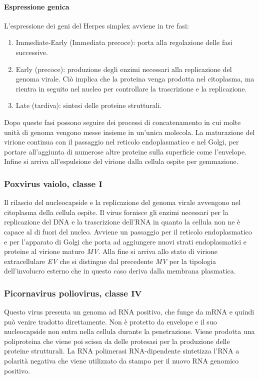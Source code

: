 			\paragraph{Espressione genica}
			L'espressione dei geni del Herpes simplex avviene in tre fasi:
			\begin{multicols}{2}
				\begin{enumerate}
    					\item Immediate-Early (Immediata precoce): porta alla regolazione delle fasi successive. 
    					\item Early (precoce): produzione degli enzimi necessari alla replicazione del genoma virale. 
						Ci\`o implica che la proteina venga prodotta nel citoplasma, ma rientra in seguito nel nucleo per controllare la trascrizione e la replicazione.
    					\item Late (tardiva): sintesi delle proteine strutturali.
				\end{enumerate}
			\end{multicols}
			Dopo queste fasi possono seguire dei processi di concatenamento in cui molte unit\`a di genoma vengono messe insieme in un'unica molecola. 
			La maturazione del virione continua con il passaggio nel reticolo endoplasmatico e nel Golgi, per portare all'aggiunta di numerose altre proteine sulla superficie come l'envelope. 
			Infine si arriva all'espulsione del virione dalla cellula ospite per gemmazione.

		\subsubsection{Poxvirus vaiolo, classe $\mathbf{I}$}
		Il rilascio del nucleocapside e la replicazione del genoma virale avvengono nel citoplasma della cellula ospite.
		Il virus fornisce gli enzimi necessari per la replicazione del DNA e la trascrizione dell'RNA in quanto la cellula non ne \`e capace al di fuori del nucleo.
		Avviene un passaggio per il reticolo endoplasmatico e per l'apparato di Golgi che porta ad aggiungere nuovi strati endoplasmatici e proteine al virione maturo \emph{MV}. 
		Alla fine si arriva allo stato di virione extracellulare \emph{EV} che si distingue dal precedente \emph{MV} per la tipologia dell'involucro esterno che in questo caso deriva dalla membrana plasmatica.

		\subsubsection{Picornavirus poliovirus, classe $\mathbf{IV}$}
		Questo virus presenta un genoma ad RNA positivo, che funge da mRNA e quindi pu\`o venire tradotto direttamente. 
		Non \`e protetto da envelope e il suo nucleocapside non entra nella cellula durante la penetrazione.
		Viene prodotta una poliproteina che viene poi scissa da delle protesasi per la produzione delle proteine strutturali. 
		La RNA polimerasi RNA-dipendente sintetizza l'RNA a polarit\`a negativa che viene utilizzato da stampo per il nuovo RNA genomico positivo. 

